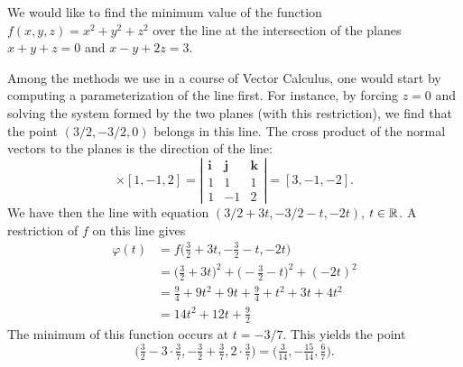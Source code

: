 \begin{example}\label{example:ProjMethods}
We would like to find the minimum value of the function $f(x,y,z)=x^2+y^2+z^2$ over the line at the intersection of the planes $x+y+z=0$ and $x-y+2z=3$.  

Among the methods we use in a course of Vector Calculus, one would start by computing a parameterization of the line first.  For instance, by forcing $z=0$ and solving the system formed by the two planes (with this restriction), we find that the point $(3/2,-3/2,0)$ belongs in this line.  The cross product of the normal vectors to the planes is the direction of the line: 
\begin{equation*}
[1,1,1] \times [1,-1,2] = \left\lvert \begin{matrix} \boldsymbol{i} & \boldsymbol{j} & \boldsymbol{k} \\ 1 & 1 & 1 \\ 1 & -1 & 2 \end{matrix} \right\rvert= [3,-1,-2].
\end{equation*}
We have then the line with equation $(3/2+3t, -3/2-t, -2t)$, $t\in \mathbb{R}$.  A restriction of $f$ on this line gives
\begin{align*}
\varphi(t) &= f \big(\tfrac{3}{2}+3t, -\tfrac{3}{2}-t, -2t \big) \\
           &= \big( \tfrac{3}{2}  + 3t \big)^2 + \big( -\tfrac{3}{2} - t \big)^2 + (-2t)^2 \\
           &= \tfrac{9}{4} + 9t^2 + 9t + \tfrac{9}{4} + t^2 + 3t + 4t^2 \\
           &= 14t^2 + 12t + \tfrac{9}{2}
\end{align*}
The minimum of this function occurs at $t=-3/7$.  This yields the point 
\begin{equation*}
\big( \tfrac{3}{2} - 3 \cdot\tfrac{3}{7}, -\tfrac{3}{2} + \tfrac{3}{7}, 2\cdot \tfrac{3}{7} \big) = \big( \tfrac{3}{14}, -\tfrac{15}{14}, \tfrac{6}{7} \big).
\end{equation*}


\end{example}
